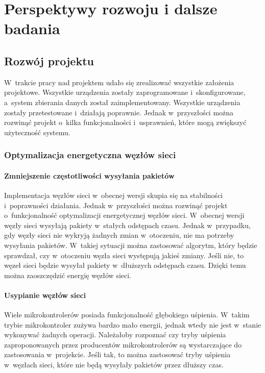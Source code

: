 \chapter{Perspektywy rozwoju i dalsze badania}

\section{Rozwój projektu}
W~trakcie pracy nad projektem udało się zrealizować wszystkie założenia projektowe.
Wszystkie urządzenia zostały zaprogramowane i~skonfigurowane, a~system zbierania danych został zaimplementowany.
Wszystkie urządzenia zostały przetestowane i~działają poprawnie.
Jednak w~przyszłości można rozwinąć projekt o~kilka funkcjonalności i~usprawnień, które mogą zwiększyć użyteczność systemu.

\subsection{Optymalizacja energetyczna węzłów sieci}
\subsubsection*{Zmniejszenie częstotliwości wysyłania pakietów}
Implementacja węzłów sieci w~obecnej wersji skupia się na stabilności i~poprawności działania.
Jednak w~przyszłości można rozwinąć projekt o~funkcjonalność optymalizacji energetycznej węzłów sieci.
W~obecnej wersji węzły sieci wysyłają pakiety w~stałych odstępach czasu.
Jednak w~przypadku, gdy węzły sieci nie wykryją żadnych zmian w~otoczeniu, nie ma potrzeby wysyłania pakietów.
W~takiej sytuacji można zastosować algorytm, który będzie sprawdzał, czy w~otoczeniu węzła sieci występują jakieś zmiany.
Jeśli nie, to węzeł sieci będzie wysyłał pakiety w~dłuższych odstępach czasu.
Dzięki temu można zaoszczędzić energię węzłów sieci.

\subsubsection{Usypianie węzłów sieci}

Wiele mikrokontrolerów posiada funkcjonalność głębokiego uśpienia.
W~takim trybie mikrokontroler zużywa bardzo mało energii, jednak wtedy nie jest w~stanie wykonywać żadnych operacji.
Należałoby rozpoznać czy tryby uśpienia zaproponowanych przez producentów mikrokontrolerów są wystarczające do zastosowania w~projekcie.
Jeśli tak, to można zastosować tryby uśpienia w~węzłach sieci, które nie będą wysyłały pakietów przez dłuższy czas.

